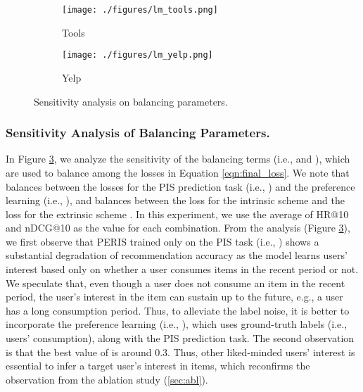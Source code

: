 \documentclass[sigconf]{acmart}
\newcommand{\MD}{{\small\textsf{PERIS}}}
\begin{document}
\begin{figure}
     \centering
     \begin{subfigure}[b]{0.475\linewidth}
         \centering
         \texttt{[image: ./figures/lm\_tools.png]}
         \caption{Tools}
         \label{fig:sense_train}
     \end{subfigure}
     \begin{subfigure}[b]{0.475\linewidth}
         \centering
         \texttt{[image: ./figures/lm\_yelp.png]}
         \caption{Yelp}
         \label{fig:sense_test}
     \end{subfigure}
     \caption{Sensitivity analysis on balancing parameters.}
     \label{fig:sensitivity}
\end{figure}


\subsubsection{\textbf{Sensitivity Analysis of Balancing Parameters.}}
In Figure \ref{fig:sensitivity}, we analyze the sensitivity of the balancing terms (i.e.,  and ), which are used to balance among the losses in Equation \ref{eqn:final_loss}. We note that  balances between the losses for the PIS prediction task (i.e., ) and the preference learning (i.e., ), and  balances between the loss for the intrinsic scheme  and the loss for the extrinsic scheme . 
In this experiment, we use the average of HR@10 and nDCG@10 as the value for each combination. 
From the analysis (Figure \ref{fig:sensitivity}), we first observe that \MD{} trained only on the PIS task (i.e., ) shows a substantial degradation of recommendation accuracy as the model learns users' interest based only on whether a user consumes items in the recent period or not. We speculate that, even though a user does not consume an item in the recent period, the user's interest in the item can sustain up to the future, e.g., a user has a long consumption period. Thus, to alleviate the label noise, it is better  to incorporate the preference learning (i.e., ), which uses ground-truth labels (i.e., users' consumption), along with the PIS prediction task. The second observation is that the best value of  is around 0.3. Thus, other liked-minded users' interest is essential to infer a target user's interest in items, which reconfirms the observation from the ablation study (\cref{sec:abl}).
\end{document}
